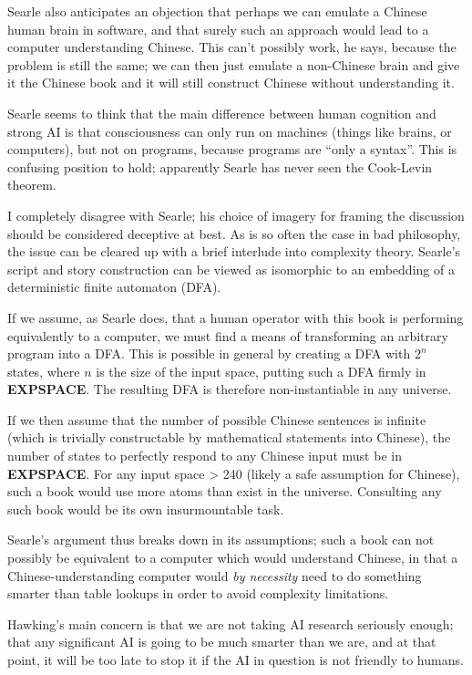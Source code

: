 \documentclass[12pt]{article}
\begin{document}
Searle also anticipates an objection that perhaps we can emulate a Chinese human brain in software, and that surely such
an approach would lead to a computer understanding Chinese. This can't possibly work, he says, because the problem is
still the same; we can then just emulate a non-Chinese brain and give it the Chinese book and it will still construct
Chinese without understanding it.

\problemsub
Searle seems to think that the main difference between human cognition and strong AI is that consciousness can only run
on machines (things like brains, or computers), but not on programs, because programs are ``only a syntax''.  This is
confusing position to hold; apparently Searle has never seen the Cook-Levin theorem.

\problemsub
I completely disagree with Searle; his choice of imagery for framing the discussion should be considered deceptive at
best. As is so often the case in bad philosophy, the issue can be cleared up with a brief interlude into complexity
theory. Searle's script and story construction can be viewed as isomorphic to an embedding of a deterministic finite
automaton (DFA).

If we assume, as Searle does, that a human operator with this book is performing equivalently to a computer, we must
find a means of transforming an arbitrary program into a DFA. This is possible in general by creating a DFA with $2^n$
states, where $n$ is the size of the input space, putting such a DFA firmly in \textbf{EXPSPACE}. The resulting DFA is
therefore non-instantiable in any universe.

If we then assume that the number of possible Chinese sentences is infinite (which is trivially constructable by
mathematical statements into Chinese), the number of states to perfectly respond to any Chinese input must be in
\textbf{EXPSPACE}. For any input space > 240 (likely a safe assumption for Chinese), such a book would use more atoms
than exist in the universe. Consulting any such book would be its own insurmountable task.

Searle's argument thus breaks down in its assumptions; such a book can not possibly be equivalent to a computer which
would understand Chinese, in that a Chinese-understanding computer would \textit{by necessity} need to do something
smarter than table lookups in order to avoid complexity limitations.


\problemsub
Hawking's main concern is that we are not taking AI research seriously enough; that any significant AI is going to be
much smarter than we are, and at that point, it will be too late to stop it if the AI in question is not friendly to
humans.
\end{document}
